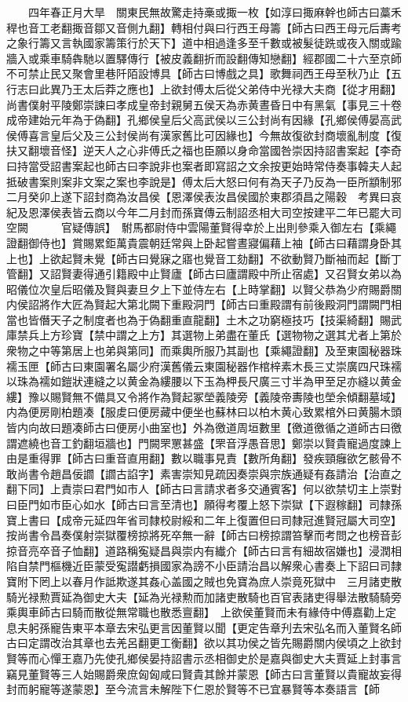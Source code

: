 　　四年春正月大旱　關東民無故驚走持槀或掫一枚【如淳曰掫麻幹也師古曰藁禾稈也音工老翻掫音鄒又音側九翻】轉相付與曰行西王母籌【師古曰西王母元后夀考之象行籌又言執國家籌策行於天下】道中相過逢多至千數或被髮徒跣或夜入關或踰牆入或乘車騎犇馳以置驛傳行【被皮義翻折而設翻傳知戀翻】經郡國二十六至京師不可禁止民又聚會里巷阡陌設博具【師古曰博戲之具】歌舞祠西王母至秋乃止【五行志曰此異乃王太后莽之應也】上欲封傅太后從父弟侍中光禄大夫商【從才用翻】尚書僕射平陵鄭崇諫曰孝成皇帝封親舅五侯天為赤黄晝昏日中有黑氣【事見三十卷成帝建始元年為于偽翻】孔鄉侯皇后父高武侯以三公封尚有因緣【孔鄉侯傅晏高武侯傅喜言皇后父及三公封侯尚有漢家舊比可因緣也】今無故復欲封商壞亂制度【復扶又翻壞音怪】逆天人之心非傅氏之福也臣願以身命當國咎崇因持詔書案起【李奇曰持當受詔書案起也師古曰李說非也案者即寫詔之文余按更始時常侍奏事韓夫人起抵破書案則案非文案之案也李說是】傅太后大怒曰何有為天子乃反為一臣所顓制邪二月癸卯上遂下詔封商為汝昌侯【恩澤侯表汝昌侯國於東郡須昌之陽穀　考異曰哀紀及恩澤侯表皆云商以今年二月封而孫寶傳云制詔丞相大司空按建平二年已罷大司空闕　　　官疑傳誤】　駙馬都尉侍中雲陽董賢得幸於上出則參乘入御左右【乘繩證翻御侍也】賞賜累鉅萬貴震朝廷常與上卧起嘗晝寢偏藉上袖【師古曰藉謂身卧其上也】上欲起賢未覺【師古曰覺寐之寤也覺音工劾翻】不欲動賢乃斷袖而起【斷丁管翻】又詔賢妻得通引籍殿中止賢廬【師古曰廬謂殿中所止宿處】又召賢女弟以為昭儀位次皇后昭儀及賢與妻旦夕上下並侍左右【上時掌翻】以賢父恭為少府賜爵關内侯詔將作大匠為賢起大第北闕下重殿洞門【師古曰重殿謂有前後殿洞門謂闕門相當也皆僭天子之制度者也為于偽翻重直龍翻】土木之功窮極技巧【技渠綺翻】賜武庫禁兵上方珍寶【禁中謂之上方】其選物上弟盡在董氏【選物物之選其尤者上第於衆物之中等第居上也弟與第同】而乘輿所服乃其副也【乘繩證翻】及至東園秘器珠襦玉匣【師古曰東園署名屬少府漢舊儀云東園秘器作棺梓素木長三丈崇廣四尺珠襦以珠為襦如鎧狀連縫之以黄金為縷腰以下玉為柙長尺廣三寸半為甲至足亦縫以黄金縷】豫以賜賢無不備具又令將作為賢起冢塋義陵旁【義陵帝夀陵也塋余傾翻墓域】内為便房剛柏題凑【服䖍曰便房藏中便坐也蘇林曰以柏木黄心致累棺外曰黄腸木頭皆内向故曰題凑師古曰便房小曲室也】外為徼道周垣數里【徼道徼循之道師古曰徼謂遮繞也音工釣翻垣牆也】門闕罘罳甚盛【罘音浮愚音思】鄭崇以賢貴寵過度諫上由是重得罪【師古曰重音直用翻】數以職事見責【數所角翻】發疾頸癰欲乞骸骨不敢尚書令趙昌佞讇【讇古諂字】素害崇知見疏因奏崇與宗族通疑有姦請治【治直之翻下同】上責崇曰君門如市人【師古曰言請求者多交通賓客】何以欲禁切主上崇對曰臣門如市臣心如水【師古曰言至清也】願得考覆上怒下崇獄【下遐稼翻】司隸孫寶上書曰【成帝元延四年省司隸校尉綏和二年上復置但曰司隸冠進賢冠屬大司空】按尚書令昌奏僕射崇獄覆榜掠將死卒無一辭【師古曰榜掠謂笞擊而考問之也榜音彭掠音亮卒音子恤翻】道路稱寃疑昌與崇内有纎介【師古曰言有細故宿嫌也】浸潤相陷自禁門樞機近臣蒙受寃譛虧損國家為謗不小臣請治昌以解衆心書奏上下詔曰司隸寶附下罔上以春月作詆欺遂其姦心盖國之賊也免寶為庶人崇竟死獄中　三月諸吏散騎光禄勲賈延為御史大夫【延為光禄勲而加諸吏散騎也百官表諸吏得舉法散騎騎旁乘輿車師古曰騎而散從無常職也散悉亶翻】　上欲侯董賢而未有緣侍中傅嘉勸上定息夫躬孫寵告東平本章去宋弘更言因董賢以聞【更定告章刋去宋弘名而入董賢名師古曰定謂改治其章也去羌呂翻更工衡翻】欲以其功侯之皆先賜爵關内侯頃之上欲封賢等而心憚王嘉乃先使孔鄉侯晏持詔書示丞相御史於是嘉與御史大夫賈延上封事言竊見董賢等三人始賜爵衆庶匈匈咸曰賢貴其餘并蒙恩【師古曰言董賢以貴寵故妄得封而躬寵等遂蒙恩】至今流言未解陛下仁恩於賢等不已宜暴賢等本奏語言【師